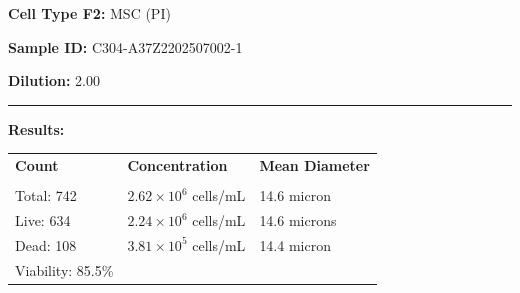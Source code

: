 \documentclass[UTF8,10pt,a4paper,fontset=fandol]{ctexart}
\newcommand{\fieldvalue}[1]{#1}
\begin{document}
\noindent
\textbf{Cell Type F2:}
\fieldvalue{MSC (PI)}

\medskip

\noindent
\textbf{Sample ID:}
\fieldvalue{C304-A37Z2202507002-1}

\noindent
\textbf{Dilution:}
\fieldvalue{2.00}

\medskip
\hrule
\medskip

\noindent
\textbf{Results:}

\medskip

\small
\begin{tabularx}{\textwidth}{@{}>{\raggedright\arraybackslash}X
                                >{\raggedright\arraybackslash}X
                                >{\raggedright\arraybackslash}X@{}}
\textbf{Count} & \textbf{Concentration} & \textbf{Mean Diameter} \\[1pt]
\underline{\hspace{3.2cm}} &
\underline{\hspace{3.2cm}} &
\underline{\hspace{3.2cm}} \\[3pt]

Total:
\fieldvalue{742}
&
\fieldvalue{$2.62\times10^{6}$ cells/mL}
&
\fieldvalue{14.6 micron}
\\[3pt]

Live:
\fieldvalue{634}
&
\fieldvalue{$2.24\times10^{6}$ cells/mL}
&
\fieldvalue{14.6 microns}
\\[3pt]

Dead:
\fieldvalue{108}
&
\fieldvalue{$3.81\times10^{5}$ cells/mL}
&
\fieldvalue{14.4 micron}
\\[3pt]

Viability:
\fieldvalue{85.5\%}
&
&
\end{tabularx}
\normalsize
\end{document}
